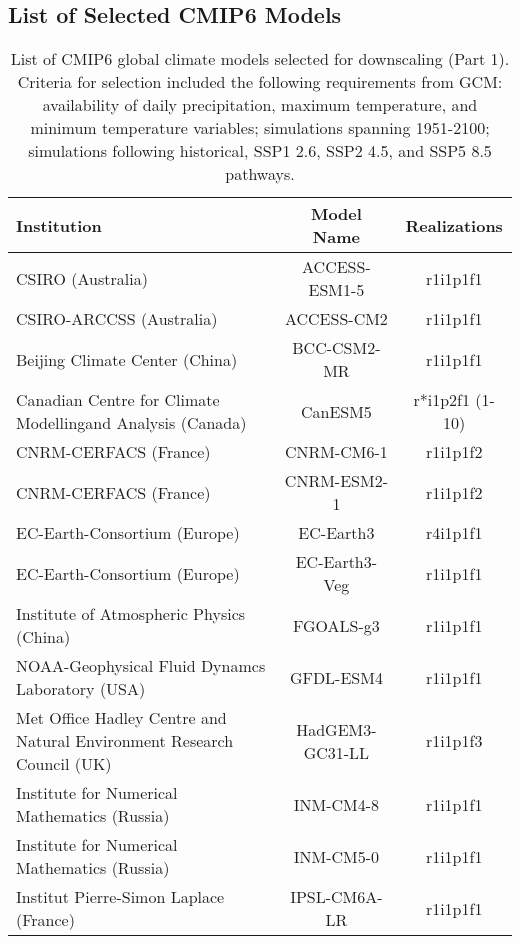 \documentclass[]{scrartcl}
\begin{document}
\clearpage

\begin{appendices}

\section{List of Selected CMIP6 Models}\label{cmip6_list}

\begin{table}[ht]
	\caption{List of CMIP6 global climate models selected for downscaling (Part 1). Criteria for selection included the following requirements from GCM:  availability of daily precipitation, maximum temperature, and minimum temperature variables; simulations spanning 1951-2100; simulations following historical, SSP1 2.6, SSP2 4.5, and SSP5 8.5 pathways.}\label{table:gcm1}
	\begin{center}
	\begin{tabularx}{\linewidth}{|L|cc|} 
			\hline
			\textbf{Institution} & \textbf{Model Name} & \textbf{Realizations}  \\
			\hline
			CSIRO (Australia)                     & ACCESS-ESM1-5 & r1i1p1f1   \\
			CSIRO-ARCCSS (Australia) & ACCESS-CM2 & r1i1p1f1 \\
		    Beijing Climate Center (China) & BCC-CSM2-MR & r1i1p1f1  \\
		    Canadian Centre for Climate Modelling\newline and Analysis (Canada) & CanESM5 & r*i1p2f1 (1-10) \\
			CNRM-CERFACS (France) & CNRM-CM6-1 & r1i1p1f2 \\  	
			CNRM-CERFACS (France) & CNRM-ESM2-1 & r1i1p1f2 \\	  
			EC-Earth-Consortium (Europe) & EC-Earth3 & r4i1p1f1 \\
			EC-Earth-Consortium (Europe) & EC-Earth3-Veg & r1i1p1f1 \\	  
			Institute of Atmospheric Physics (China) & FGOALS-g3 & r1i1p1f1 \\
			NOAA-Geophysical Fluid Dynamcs Laboratory (USA) & GFDL-ESM4 & r1i1p1f1 \\
			Met Office Hadley Centre and \newline Natural Environment Research Council (UK) & HadGEM3-GC31-LL & r1i1p1f3 \\
			Institute for Numerical Mathematics (Russia) & INM-CM4-8 & r1i1p1f1 \\
			Institute for Numerical Mathematics (Russia) & INM-CM5-0 & r1i1p1f1 \\	
			Institut Pierre-Simon Laplace (France) & IPSL-CM6A-LR & r1i1p1f1 \\	
			\hline
		\end{tabularx}
	\end{center}
\end{table}


\end{appendices}
\end{document}
